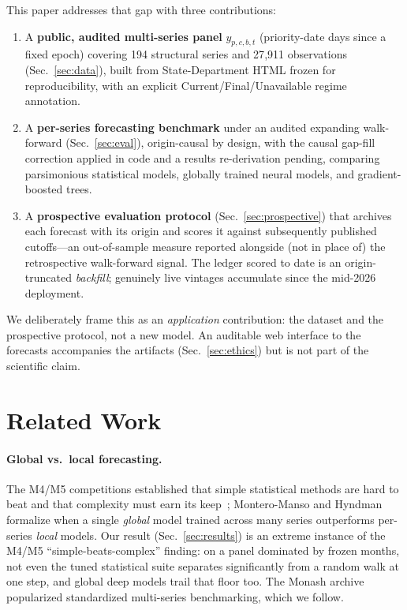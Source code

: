 \documentclass[runningheads]{llncs}
\begin{document}
This paper addresses that gap with three contributions:
\begin{enumerate}
  \item A \textbf{public, audited multi-series panel} $y_{p,c,b,t}$ (priority-date
  days since a fixed epoch) covering 194 structural series and 27{,}911
  observations (Sec.~\ref{sec:data}), built from State-Department HTML frozen for
  reproducibility, with an explicit Current/Final/Unavailable regime annotation.
  \item A \textbf{per-series forecasting benchmark} under an audited expanding
  walk-forward (Sec.~\ref{sec:eval}), origin-causal by design, with the causal
  gap-fill correction applied in code and a results re-derivation pending,
  comparing parsimonious statistical models, globally trained neural models, and
  gradient-boosted trees.
  \item A \textbf{prospective evaluation protocol} (Sec.~\ref{sec:prospective})
  that archives each forecast with its origin and scores it against subsequently
  published cutoffs---an out-of-sample measure reported alongside (not in place
  of) the retrospective walk-forward signal. The ledger scored to date is an
  origin-truncated \emph{backfill}; genuinely live vintages accumulate since the
  mid-2026 deployment.
\end{enumerate}
We deliberately frame this as an \emph{application} contribution: the dataset and
the prospective protocol, not a new model. An auditable web interface to the
forecasts accompanies the artifacts (Sec.~\ref{sec:ethics}) but is not part of
the scientific claim.

\section{Related Work}
\label{sec:related}

\paragraph{Global vs.\ local forecasting.} The M4/M5 competitions established that
simple statistical methods are hard to beat and that complexity must earn its
keep~\cite{makridakis2020,makridakis2022}; Montero-Manso and Hyndman~\cite{montero2021}
formalize when a single \emph{global} model trained across many series outperforms
per-series \emph{local} models. Our result (Sec.~\ref{sec:results}) is an extreme
instance of the M4/M5 ``simple-beats-complex'' finding: on a panel dominated by
frozen months, not even the tuned statistical suite separates significantly from a
random walk at one step, and global deep models trail that floor too. The Monash
archive~\cite{godahewa2021} popularized standardized multi-series benchmarking,
which we follow.
\end{document}
